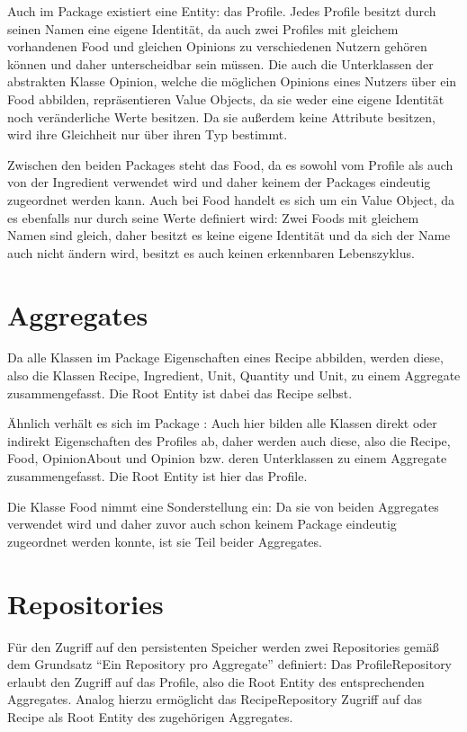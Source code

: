 Auch im Package \href{https://github.com/anditru/quickie/tree/bb41442c7f1ffbfcd3117cd86a40f7932e543a33/3-quickie-domain/src/main/java/org/pinkcrazyunicorn/quickie/domain/recipe}{} existiert eine Entity: das Profile. Jedes Profile besitzt durch seinen Namen eine eigene Identität, da auch zwei Profiles mit gleichem vorhandenen Food und gleichen Opinions zu verschiedenen Nutzern gehören können und daher unterscheidbar sein müssen. Die auch die Unterklassen der abstrakten Klasse Opinion, welche die möglichen Opinions eines Nutzers über ein Food abbilden, repräsentieren Value Objects, da sie weder eine eigene Identität noch veränderliche Werte besitzen. Da sie außerdem keine Attribute besitzen, wird ihre Gleichheit nur über ihren Typ bestimmt.

Zwischen den beiden Packages steht das Food, da es sowohl vom Profile als auch von der Ingredient verwendet wird und daher keinem der Packages eindeutig zugeordnet werden kann. Auch bei Food handelt es sich um ein Value Object, da es ebenfalls nur durch seine Werte definiert wird: Zwei Foods mit gleichem Namen sind gleich, daher besitzt es keine eigene Identität und da sich der Name auch nicht ändern wird, besitzt es auch keinen erkennbaren Lebenszyklus. 

\section{Aggregates}
Da alle Klassen im Package \href{https://github.com/anditru/quickie/tree/bb41442c7f1ffbfcd3117cd86a40f7932e543a33/3-quickie-domain/src/main/java/org/pinkcrazyunicorn/quickie/domain/recipe}{} Eigenschaften eines Recipe abbilden, werden diese, also die Klassen Recipe, Ingredient, Unit, Quantity und Unit, zu einem Aggregate zusammengefasst. Die Root Entity ist dabei das Recipe selbst.

Ähnlich verhält es sich im Package \href{https://github.com/anditru/quickie/tree/bb41442c7f1ffbfcd3117cd86a40f7932e543a33/3-quickie-domain/src/main/java/org/pinkcrazyunicorn/quickie/domain/profile}{}: Auch hier bilden alle Klassen direkt oder indirekt Eigenschaften des Profiles ab, daher werden auch diese, also die Recipe, Food, OpinionAbout und Opinion bzw. deren Unterklassen zu einem Aggregate zusammengefasst. Die Root Entity ist hier das Profile.

Die Klasse Food nimmt eine Sonderstellung ein: Da sie von beiden Aggregates verwendet wird und daher zuvor auch schon keinem Package eindeutig zugeordnet werden konnte, ist sie Teil beider Aggregates.

\section{Repositories}
Für den Zugriff auf den persistenten Speicher werden zwei Repositories gemäß dem Grundsatz \enquote{Ein Repository pro Aggregate} definiert: Das ProfileRepository erlaubt den Zugriff auf das Profile, also die Root Entity des entsprechenden Aggregates. Analog hierzu ermöglicht das RecipeRepository Zugriff auf das Recipe als Root Entity des zugehörigen Aggregates. 
